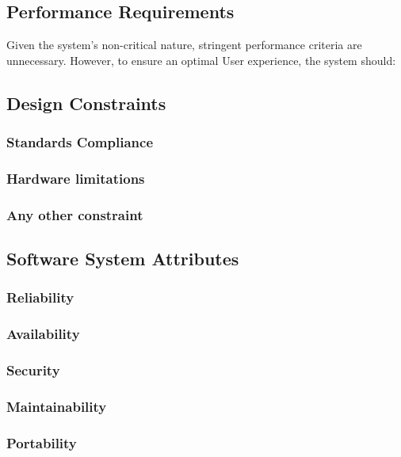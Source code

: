 \subsection{Performance Requirements}
 Given the system's non-critical nature, stringent performance criteria are unnecessary. However, to ensure an optimal User experience, the system should:

\subsection{Design Constraints}
\subsubsection{Standards Compliance}
\subsubsection{Hardware limitations}
\subsubsection{Any other constraint}
\subsection{Software System Attributes}
\subsubsection{Reliability}
\subsubsection{Availability}
\subsubsection{Security}
\subsubsection{Maintainability}
\subsubsection{Portability}
